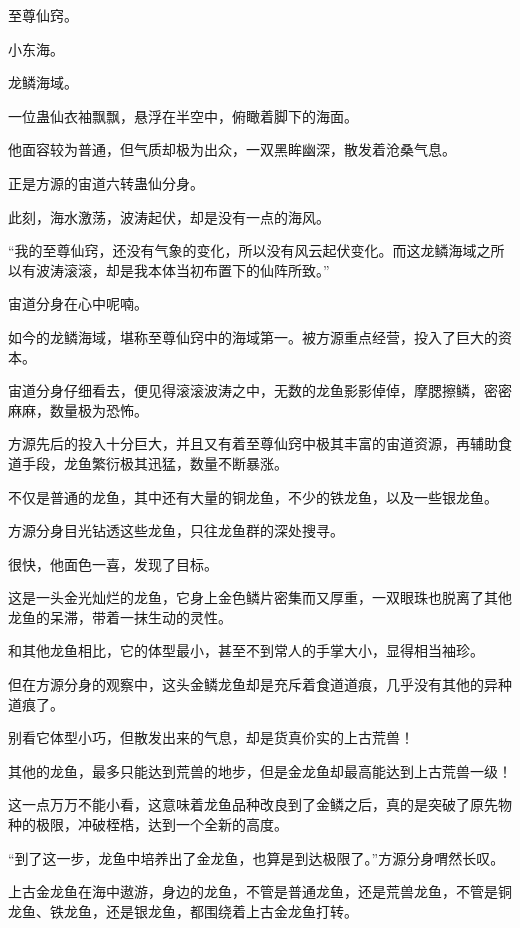 
\begin{this_body}

至尊仙窍。

小东海。

龙鳞海域。

一位蛊仙衣袖飘飘，悬浮在半空中，俯瞰着脚下的海面。

他面容较为普通，但气质却极为出众，一双黑眸幽深，散发着沧桑气息。

正是方源的宙道六转蛊仙分身。

此刻，海水激荡，波涛起伏，却是没有一点的海风。

“我的至尊仙窍，还没有气象的变化，所以没有风云起伏变化。而这龙鳞海域之所以有波涛滚滚，却是我本体当初布置下的仙阵所致。”

宙道分身在心中呢喃。

如今的龙鳞海域，堪称至尊仙窍中的海域第一。被方源重点经营，投入了巨大的资本。

宙道分身仔细看去，便见得滚滚波涛之中，无数的龙鱼影影倬倬，摩腮擦鳞，密密麻麻，数量极为恐怖。

方源先后的投入十分巨大，并且又有着至尊仙窍中极其丰富的宙道资源，再辅助食道手段，龙鱼繁衍极其迅猛，数量不断暴涨。

不仅是普通的龙鱼，其中还有大量的铜龙鱼，不少的铁龙鱼，以及一些银龙鱼。

方源分身目光钻透这些龙鱼，只往龙鱼群的深处搜寻。

很快，他面色一喜，发现了目标。

这是一头金光灿烂的龙鱼，它身上金色鳞片密集而又厚重，一双眼珠也脱离了其他龙鱼的呆滞，带着一抹生动的灵性。

和其他龙鱼相比，它的体型最小，甚至不到常人的手掌大小，显得相当袖珍。

但在方源分身的观察中，这头金鳞龙鱼却是充斥着食道道痕，几乎没有其他的异种道痕了。

别看它体型小巧，但散发出来的气息，却是货真价实的上古荒兽！

其他的龙鱼，最多只能达到荒兽的地步，但是金龙鱼却最高能达到上古荒兽一级！

这一点万万不能小看，这意味着龙鱼品种改良到了金鳞之后，真的是突破了原先物种的极限，冲破桎梏，达到一个全新的高度。

“到了这一步，龙鱼中培养出了金龙鱼，也算是到达极限了。”方源分身喟然长叹。

上古金龙鱼在海中遨游，身边的龙鱼，不管是普通龙鱼，还是荒兽龙鱼，不管是铜龙鱼、铁龙鱼，还是银龙鱼，都围绕着上古金龙鱼打转。


\end{this_body}
